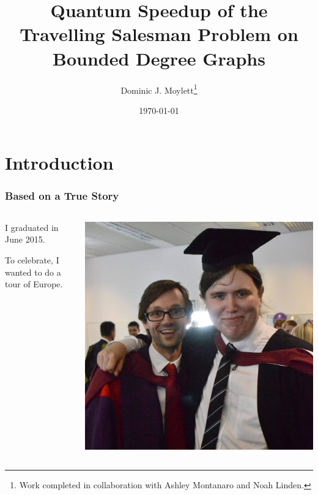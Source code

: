 \documentclass[aspectratio=169]{beamer}
\title[The Travelling Salesman Problem]{Quantum Speedup of the Travelling Salesman Problem on Bounded Degree Graphs} %
\author[Dominic J. Moylett]{Dominic J. Moylett\footnote{Work completed in collaboration with Ashley Montanaro and Noah Linden.}} %
\institute[University of Bristol] %
{
School of Physics and Department of Electrical and Electronic Engineering\\
University of Bristol \\ %
\medskip
\textit{\href{mailto:dominic.moylett@bristol.ac.uk}{dominic.moylett@bristol.ac.uk}} %
}
\date{\today} %
\begin{document}
\begin{frame}
\titlepage %
\end{frame}


\section{Introduction}

\begin{frame}
\frametitle{Based on a True Story}
\begin{columns}[T]
\begin{column}{.5\textwidth}
I graduated in June 2015.

To celebrate, I wanted to do a tour of Europe.
\end{column}
\begin{column}{.5\textwidth}
\includegraphics[scale=0.15]{graduation}
\end{column}
\end{columns}
\end{frame}
\end{document}
